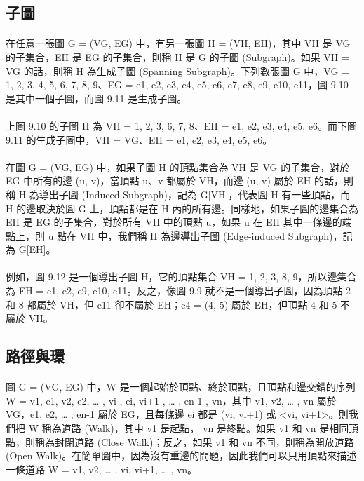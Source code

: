 \documentclass[12pt,a4paper,oneside]{report}
\begin{document}
\begin{CJK}{UTF8}{bkai}
\subsection{子圖}
\paragraph{}在任意一張圖 G = (VG, EG) 中，有另一張圖 H = (VH, EH)，其中 VH 是 VG 的子集合，EH 是 EG 的子集合，則稱 H 是 G 的子圖 (Subgraph)。如果 VH = VG 的話，則稱 H 為生成子圖 (Spanning Subgraph)。下列數張圖 G 中，VG = {1, 2, 3, 4, 5, 6, 7, 8, 9}、EG = {e1, e2, e3, e4, e5, e6, e7, e8, e9, e10, e11}，圖 9.10 是其中一個子圖，而圖 9.11 是生成子圖。
\paragraph{}上圖 9.10 的子圖 H 為 VH = {1, 2, 3, 6, 7, 8}、EH = {e1, e2, e3, e4, e5, e6}。而下圖 9.11 的生成子圖中，VH = VG、EH = {e1, e2, e3, e4, e5, e6}。
\paragraph{}在圖 G = (VG, EG) 中，如果子圖 H 的頂點集合為 VH 是 VG 的子集合，對於 EG 中所有的邊 (u, v)，當頂點 u、v 都屬於 VH，而邊 (u, v) 屬於 EH 的話，則稱 H 為導出子圖 (Induced Subgraph)，記為 G[VH]，代表圖 H 有一些頂點，而 H 的邊取決於圖 G 上，頂點都是在 H 內的所有邊。同樣地，如果子圖的邊集合為 EH 是 EG 的子集合，對於所有 VH 中的頂點 u，如果 u 在 EH 其中一條邊的端點上，則 u 點在 VH 中，我們稱 H 為邊導出子圖 (Edge-induced Subgraph)，記為 G[EH]。
\paragraph{}例如，圖 9.12 是一個導出子圖 H，它的頂點集合 VH = {1, 2, 3, 8, 9}，所以邊集合為 EH = {e1, e2, e9, e10, e11}。反之，像圖 9.9 就不是一個導出子圖，因為頂點 2 和 8 都屬於 VH，但 e11 卻不屬於 EH；e4 = (4, 5) 屬於 EH，但頂點 4 和 5 不屬於 VH。

\subsection{路徑與環}
\paragraph{}圖 G = (VG, EG) 中，W 是一個起始於頂點、終於頂點，且頂點和邊交錯的序列 W = {v1, e1, v2, e2, … , vi , ei, vi+1 , … , en-1 , vn}，其中 v1, v2, … , vn 屬於 VG，e1, e2, … , en-1 屬於 EG，且每條邊 ei 都是 (vi, vi+1) 或 <vi, vi+1>。則我們把 W 稱為道路 (Walk)，其中 v1 是起點， vn 是終點。如果 v1 和 vn 是相同頂點，則稱為封閉道路 (Close Walk)；反之，如果 v1 和 vn 不同，則稱為開放道路 (Open Walk)。在簡單圖中，因為沒有重邊的問題，因此我們可以只用頂點來描述一條道路 W = {v1, v2, … , vi, vi+1, … , vn}。

\end{CJK}
\end{document}
